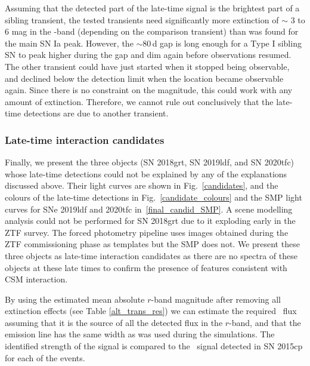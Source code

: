 \documentclass[a4paper,oneside,12pt, class=Latex/Classes/PhDthesisPSnPDF, crop=false]{standalone}
\begin{document}
Assuming that the detected part of the late-time signal is the brightest part of a sibling transient, the tested transients need significantly more extinction of $\sim$ 3 to 6 mag in the \ztfr-band (depending on the comparison transient) than was found for the main SN Ia peak. However, the $\sim 80$\,d gap is long enough for a Type I sibling SN to peak higher during the gap and dim again before observations resumed. The other transient could have just started when it stopped being observable, and declined below the detection limit when the location became observable again. Since there is no constraint on the magnitude, this could work with any amount of extinction. Therefore, we cannot rule out conclusively that the late-time detections are due to another transient.


\subsubsection{Late-time interaction candidates}
\label{sec:late_time_cand}
Finally, we present the three objects (SN 2018grt, SN 2019ldf, and SN 2020tfc) whose late-time detections could not be explained by any of the explanations discussed above. Their light curves are shown in Fig.~\ref{candidates}, and the colours of the late-time detections in Fig.~\ref{candidate_colours} and the SMP light curves for SNe 2019ldf and 2020tfc in~\ref{final_candid_SMP}. A scene modelling analysis could not be performed for SN 2018grt due to it exploding early in the ZTF survey. The forced photometry pipeline uses images obtained during the ZTF commissioning phase as templates but the SMP does not. We present these three objects as late-time interaction candidates as there are no spectra of these objects at these late times to confirm the presence of features consistent with CSM interaction.

By using the estimated mean absolute $r$-band magnitude after removing all extinction effects (see Table \ref{alt_trans_res}) we can estimate the required \Halpha~flux assuming that it is the source of all the detected flux in the $r$-band, and that the emission line has the same width as was used during the simulations. The identified strength of the signal is compared to the \Halpha~signal detected in SN 2015cp for each of the events.
\end{document}
